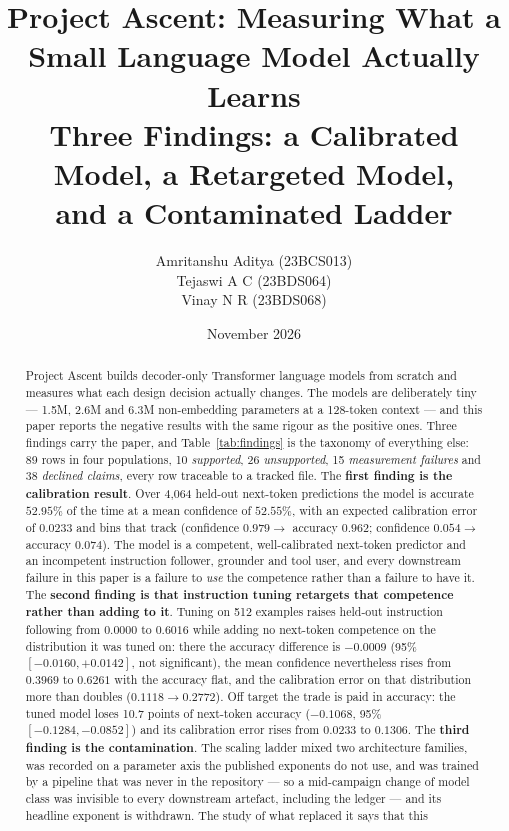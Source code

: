 \documentclass[11pt,a4paper]{article}
\title{Project Ascent: Measuring What a Small Language Model Actually Learns\\
\large Three Findings: a Calibrated Model, a Retargeted Model,\\
and a Contaminated Ladder}
\author{Amritanshu Aditya (23BCS013)\\
Tejaswi A C (23BDS064)\\
Vinay N R (23BDS068)}
\date{November 2026}
\begin{document}
\maketitle

\begin{abstract}
Project Ascent builds decoder-only Transformer language models from scratch and
measures what each design decision actually changes. The models are deliberately
tiny --- 1.5M, 2.6M and 6.3M non-embedding parameters at a 128-token context ---
and this paper reports the negative results with the same rigour as the positive
ones. Three findings carry the paper, and Table~\ref{tab:findings} is the
taxonomy of everything else: 89 rows in four populations, 10 \emph{supported},
26 \emph{unsupported}, 15 \emph{measurement failures} and 38
\emph{declined claims}, every row traceable to a tracked file. The
\textbf{first finding is the calibration result}. Over 4,064 held-out
next-token predictions the model is accurate $52.95\%$ of the time at a mean
confidence of $52.55\%$, with an expected calibration error of $0.0233$ and
bins that track (confidence $0.979 \rightarrow$ accuracy $0.962$; confidence
$0.054 \rightarrow$ accuracy $0.074$). The model is a competent, well-calibrated
next-token predictor and an incompetent instruction follower, grounder and tool
user, and every downstream failure in this paper is a failure to \emph{use} the
competence rather than a failure to have it. The \textbf{second finding is
that instruction tuning retargets that competence rather than adding to it}.
Tuning on 512 examples raises held-out instruction following from $0.0000$ to
$0.6016$ while adding no next-token competence on the distribution it was tuned
on: there the accuracy difference is $-0.0009$ (95\% $[-0.0160, +0.0142]$, not
significant), the mean confidence nevertheless rises from $0.3969$ to $0.6261$
with the accuracy flat, and the calibration error on that distribution more
than doubles ($0.1118 \rightarrow 0.2772$). Off target the trade is paid in
accuracy: the tuned model loses 10.7 points of next-token accuracy
($-0.1068$, 95\% $[-0.1284, -0.0852]$) and its calibration error rises from
$0.0233$ to $0.1306$. The \textbf{third finding is the contamination}. The
scaling ladder mixed two architecture families, was recorded on a parameter
axis the published exponents do not use, and was trained by a pipeline that
was never in the repository --- so a mid-campaign change of model class was
invisible to every downstream artefact, including the ledger --- and its
headline exponent is withdrawn. The study of what replaced it says that this

\end{abstract}
\end{document}
